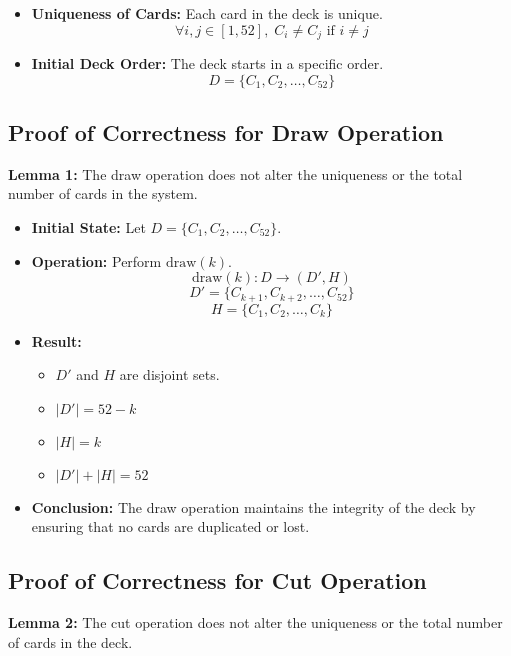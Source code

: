 \documentclass{article}
\begin{document}
\begin{itemize}
    \item \textbf{Uniqueness of Cards:} Each card in the deck is unique.
    \[
    \forall i, j \in [1, 52], \; C_i \neq C_j \text{ if } i \neq j
    \]

    \item \textbf{Initial Deck Order:} The deck starts in a specific order.
    \[
    D = \{C_1, C_2, \ldots, C_{52}\}
    \]
\end{itemize}

\subsection*{Proof of Correctness for Draw Operation}

\textbf{Lemma 1:} The draw operation does not alter the uniqueness or the total number of cards in the system.

\begin{itemize}
    \item \textbf{Initial State:} Let \( D = \{C_1, C_2, \ldots, C_{52}\} \).

    \item \textbf{Operation:} Perform \( \text{draw}(k) \).
    \[
    \text{draw}(k) : D \rightarrow (D', H)
    \]
    \[
    D' = \{C_{k+1}, C_{k+2}, \ldots, C_{52}\}
    \]
    \[
    H = \{C_1, C_2, \ldots, C_k\}
    \]

    \item \textbf{Result:}
    \begin{itemize}
        \item \( D' \) and \( H \) are disjoint sets.
        \item \( |D'| = 52 - k \)
        \item \( |H| = k \)
        \item \( |D'| + |H| = 52 \)
    \end{itemize}

    \item \textbf{Conclusion:} The draw operation maintains the integrity of the deck by ensuring that no cards are duplicated or lost.
\end{itemize}

\subsection*{Proof of Correctness for Cut Operation}

\textbf{Lemma 2:} The cut operation does not alter the uniqueness or the total number of cards in the deck.
\end{document}
